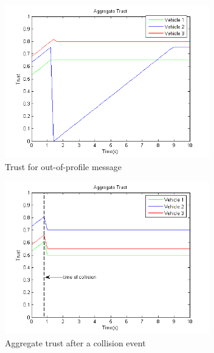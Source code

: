 \documentclass[conference]{IEEEtran}
\begin{document}
\begin{figure}[h]
\centering
\includegraphics[width=3.5in]{trust_outside_profile.png}
\caption{Trust for out-of-profile message}
\label{toutprofile}
\end{figure}

\begin{figure}[h]
\centering
\includegraphics[width=3.5in]{trust_collision.png}
\caption{Aggregate trust after a collision event}
\label{tcollision}
\end{figure}



\end{document}
